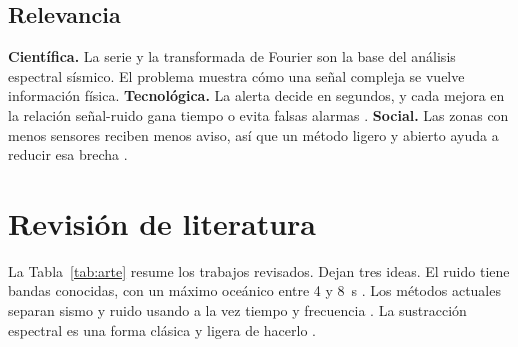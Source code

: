 \documentclass[11pt,letterpaper]{article}
\begin{document}
\subsection{Relevancia}
\textbf{Científica.} La serie y la transformada de Fourier son la base del análisis espectral sísmico. El problema muestra cómo una señal compleja se vuelve información física. \textbf{Tecnológica.} La alerta decide en segundos, y cada mejora en la relación señal-ruido gana tiempo o evita falsas alarmas \parencite{minson2018}. \textbf{Social.} Las zonas con menos sensores reciben menos aviso, así que un método ligero y abierto ayuda a reducir esa brecha \parencite{cremen2020}.

\section{Revisión de literatura}
La Tabla~\ref{tab:arte} resume los trabajos revisados. Dejan tres ideas. El ruido tiene bandas conocidas, con un máximo oceánico entre 4 y \SI{8}{s} \parencite{peterson1993,longuet1950}. Los métodos actuales separan sismo y ruido usando a la vez tiempo y frecuencia \parencite{zhu2019,mousavi2016}. La sustracción espectral es una forma clásica y ligera de hacerlo \parencite{boll1979,berouti1979}.
\end{document}
